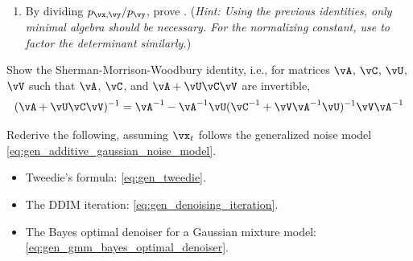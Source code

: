 \documentclass[../../book-main.tex]{subfiles}
\begin{document}
\begin{exercise}
\begin{enumerate}
\begin{align}
        \begin{bmatrix}
          \vx - \vm \\
          \vy - \vmu_{\vy}
        \end{bmatrix},
      \end{align}
	  where $\vm = (\vmu_{\vx} + \vSigma_{\vx\vy}\vSigma_{\vy}^{-1}(\vy
	  - \vmu_{\vy})$.
    \item By dividing $p_{\vx, \vy} / p_{\vy}$, prove
      . (\textit{Hint: Using the previous
      identities, only minimal algebra should be necessary. For the normalizing
      constant, use  to
      factor the determinant similarly.})

  \end{enumerate}


\end{exercise}

\begin{exercise}\label{exercise:sherman_morrison_woodbury_identity}
    Show the Sherman-Morrison-Woodbury identity, i.e., for matrices \(\vA\), \(\vC\), \(\vU\), \(\vV\) such that \(\vA\), \(\vC\), and \(\vA + \vU\vC\vV\) are invertible,
    \begin{equation}
        (\vA + \vU\vC\vV)^{-1} = \vA^{-1} - \vA^{-1}\vU(\vC^{-1} + \vV\vA^{-1}\vU)^{-1}\vV\vA^{-1}
    \end{equation}
\end{exercise}

\begin{exercise}\label{exercise:generalizing_results_to_different_noise_models}
    Rederive the following, assuming \(\vx_{t}\) follows the generalized noise model \eqref{eq:gen_additive_gaussian_noise_model}.
    \begin{itemize}
        \item Tweedie's formula: \eqref{eq:gen_tweedie}.
        \item The DDIM iteration: \eqref{eq:gen_denoising_iteration}.
        \item The Bayes optimal denoiser for a Gaussian mixture model: \eqref{eq:gen_gmm_bayes_optimal_denoiser}.
    \end{itemize}
\end{exercise}
\end{document}
